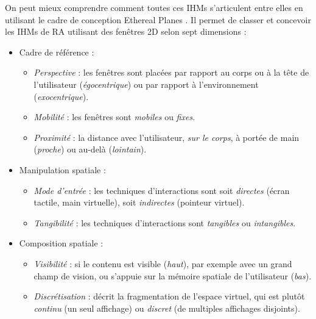 On peut mieux comprendre comment toutes ces IHMs s'articulent entre elles en utilisant le cadre de conception Ethereal Planes \citep{Ens2014a}. Il permet de classer et concevoir les IHMs de RA utilisant des fenêtres 2D selon sept dimensions :
\begin{itemize}
  \item Cadre de référence :
  \begin{itemize}
    \item \emph{Perspective} : les fenêtres sont placées par rapport au corps ou à la tête de l'utilisateur (\emph{égocentrique}) ou par rapport à l'environnement (\emph{exocentrique}).
    \item \emph{Mobilité} : les fenêtres sont \emph{mobiles} ou \emph{fixes}.
    \item \emph{Proximité} : la distance avec l'utilisateur, \emph{sur le corps}, à portée de main (\emph{proche}) ou au-delà (\emph{lointain}).
  \end{itemize}
\end{itemize}
\newpage %
\begin{itemize}
  \item Manipulation spatiale :
  \begin{itemize}
    \item \emph{Mode d'entrée} : les techniques d'interactions sont soit \emph{directes} (écran tactile, main virtuelle), soit \emph{indirectes} (pointeur virtuel).
    \item \emph{Tangibilité} : les techniques d'interactions sont \emph{tangibles} ou \emph{intangibles}.
  \end{itemize}
  \item Composition spatiale :
  \begin{itemize}
    \item \emph{Visibilité} : si le contenu est visible (\emph{haut}), par exemple avec un grand champ de vision, ou s'appuie sur la mémoire spatiale de l'utilisateur (\emph{bas}).
    \item \emph{Discrétisation} : décrit la fragmentation de l'espace virtuel, qui est plutôt \emph{continu} (un seul affichage) ou \emph{discret} (de multiples affichages disjoints).
  \end{itemize}
\end{itemize}
\medskip

